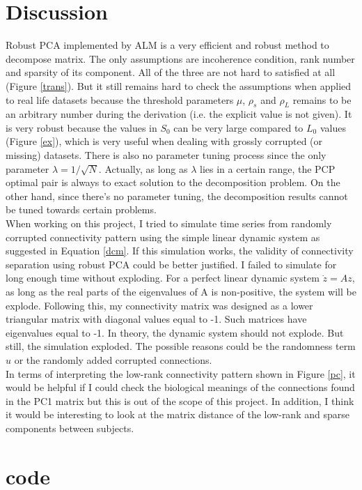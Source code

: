 \documentclass[12pt]{extarticle}
\newcommand{\<}{\langle}
\renewcommand{\>}{\rangle}
\theoremstyle{definition}
\begin{document}
\section{Discussion}
Robust PCA implemented by ALM is a very efficient and robust method to decompose matrix. The only assumptions are incoherence condition, rank number and sparsity of its component. All of the three are not hard to satisfied at all (Figure \ref{trans}). But it still remains hard to check the assumptions when applied to real life datasets because the threshold parameters $\mu$, $\rho_s$ and $\rho_L$ remains to be an arbitrary number during the derivation (i.e. the explicit value is not given). It is very robust because the values in $S_0$ can be very large compared to $L_0$ values (Figure \ref{ex}), which is very useful when dealing with grossly corrupted (or missing) datasets. There is also no parameter tuning process since the only parameter $\lambda = 1/\sqrt{N}$. Actually, as long as $\lambda$ lies in a certain range, the PCP optimal pair is always to exact solution to the decomposition problem. On the other hand, since there's no parameter tuning, the decomposition results cannot be tuned towards certain problems. \\

When working on this project, I tried to simulate time series from randomly corrupted connectivity pattern using the simple linear dynamic system as suggested in Equation \ref{dcm}. If this simulation works, the validity of connectivity separation using robust PCA could be better justified. I failed to simulate for long enough time without exploding. For a perfect linear dynamic system $\dot{z} = Az$, as long as the real parts of the eigenvalues of A is non-positive, the system will be explode. Following this, my connectivity matrix was designed as a lower triangular matrix with diagonal values equal to -1. Such matrices have eigenvalues equal to -1. In theory, the dynamic system should not explode. But still, the simulation exploded. The possible reasons could be the randomness term $u$ or the randomly added corrupted connections. \\

In terms of interpreting the low-rank connectivity pattern shown in Figure \ref{pc}, it would be helpful if I could check the biological meanings of the connections found in the PC1 matrix but this is out of the scope of this project. In addition, I think it would be interesting to look at the matrix distance of the low-rank and sparse components between subjects. 

\newpage

 
 

\section{code}



\end{document}
